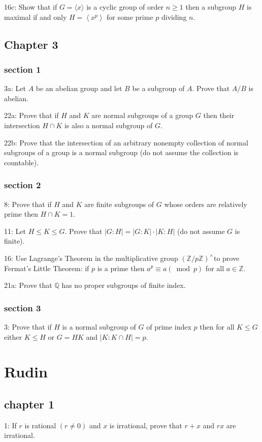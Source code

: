 \documentclass{article}
\begin{document}
16c: Show that if $G=\langle x\rangle$ is a cyclic group of order $n \geq 1$ then a subgroup $H$ is maximal if and only $H=\left\langle x^{p}\right\rangle$ for some prime $p$ dividing $n$.

\subsection*{Chapter 3}
\subsubsection*{section 1}
3a: Let $A$ be an abelian group and let $B$ be a subgroup of $A$. Prove that $A / B$ is abelian.

22a: Prove that if $H$ and $K$ are normal subgroups of a group $G$ then their intersection $H \cap K$ is also a normal subgroup of $G$.

22b: Prove that the intersection of an arbitrary nonempty collection of normal subgroups of a group is a normal subgroup (do not assume the collection is countable).

\subsubsection*{section 2}
8: Prove that if $H$ and $K$ are finite subgroups of $G$ whose orders are relatively prime then $H \cap K=1$.

11: Let $H \leq K \leq G$. Prove that $|G: H|=|G: K| \cdot|K: H|$ (do not assume $G$ is finite).

16: Use Lagrange's Theorem in the multiplicative group $(\mathbb{Z} / p \mathbb{Z})^{\times}$to prove Fermat's Little Theorem: if $p$ is a prime then $a^{p} \equiv a(\bmod p)$ for all $a \in \mathbb{Z}$.

21a: Prove that $\mathbb{Q}$ has no proper subgroups of finite index.

\subsubsection*{section 3}
3: Prove that if $H$ is a normal subgroup of $G$ of prime index $p$ then for all $K \leq G$ either $K \leq H$ or $G=H K$ and $|K: K \cap H|=p$.

\section*{Rudin}
\subsection*{chapter 1}
1: If $r$ is rational $(r \neq 0)$ and $x$ is irrational, prove that $r+x$ and $r x$ are irrational.
\end{document}
